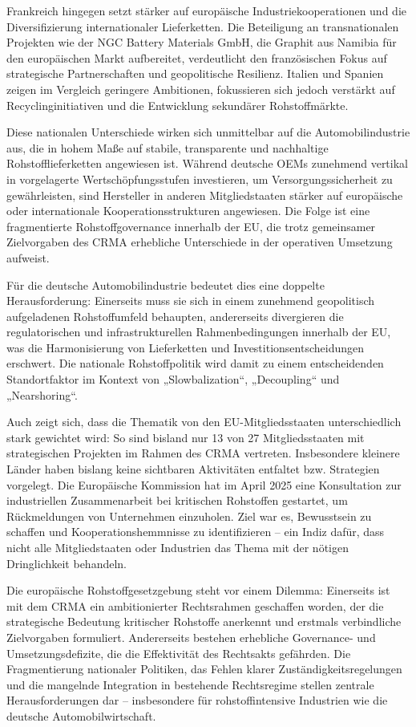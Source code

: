 \documentclass[12pt,a4paper,oneside]{book} %
\begin{document}
Frankreich hingegen setzt stärker auf europäische Industriekooperationen und die Diversifizierung internationaler Lieferketten. Die Beteiligung an transnationalen Projekten wie der NGC Battery Materials GmbH, die Graphit aus Namibia für den europäischen Markt aufbereitet, verdeutlicht den französischen Fokus auf strategische Partnerschaften und geopolitische Resilienz. Italien und Spanien zeigen im Vergleich geringere Ambitionen, fokussieren sich jedoch verstärkt auf Recyclinginitiativen und die Entwicklung sekundärer Rohstoffmärkte.

Diese nationalen Unterschiede wirken sich unmittelbar auf die Automobilindustrie aus, die in hohem Maße auf stabile, transparente und nachhaltige Rohstofflieferketten angewiesen ist. Während deutsche OEMs zunehmend vertikal in vorgelagerte Wertschöpfungsstufen investieren, um Versorgungssicherheit zu gewährleisten, sind Hersteller in anderen Mitgliedstaaten stärker auf europäische oder internationale Kooperationsstrukturen angewiesen. Die Folge ist eine fragmentierte Rohstoffgovernance innerhalb der EU, die trotz gemeinsamer Zielvorgaben des CRMA erhebliche Unterschiede in der operativen Umsetzung aufweist.

Für die deutsche Automobilindustrie bedeutet dies eine doppelte Herausforderung: Einerseits muss sie sich in einem zunehmend geopolitisch aufgeladenen Rohstoffumfeld behaupten, andererseits divergieren die regulatorischen und infrastrukturellen Rahmenbedingungen innerhalb der EU, was die Harmonisierung von Lieferketten und Investitionsentscheidungen erschwert. Die nationale Rohstoffpolitik wird damit zu einem entscheidenden Standortfaktor im Kontext von „Slowbalization“, „Decoupling“ und „Nearshoring“.

Auch zeigt sich, dass die Thematik von den EU-Mitgliedsstaaten unterschiedlich stark gewichtet wird: So sind bisland nur 13 von 27 Mitgliedsstaaten mit strategischen Projekten im Rahmen des CRMA vertreten. Insbesondere kleinere Länder haben bislang keine sichtbaren Aktivitäten entfaltet bzw. Strategien vorgelegt. Die Europäische Kommission hat im April 2025 eine Konsultation zur industriellen Zusammenarbeit bei kritischen Rohstoffen gestartet, um Rückmeldungen von Unternehmen einzuholen. Ziel war es, Bewusstsein zu schaffen und Kooperationshemmnisse zu identifizieren – ein Indiz dafür, dass nicht alle Mitgliedstaaten oder Industrien das Thema mit der nötigen Dringlichkeit behandeln.

Die europäische Rohstoffgesetzgebung steht vor einem Dilemma: Einerseits ist mit dem CRMA ein ambitionierter Rechtsrahmen geschaffen worden, der die strategische Bedeutung kritischer Rohstoffe anerkennt und erstmals verbindliche Zielvorgaben formuliert. Andererseits bestehen erhebliche Governance- und Umsetzungsdefizite, die die Effektivität des Rechtsakts gefährden. Die Fragmentierung nationaler Politiken, das Fehlen klarer Zuständigkeitsregelungen und die mangelnde Integration in bestehende Rechtsregime stellen zentrale Herausforderungen dar -- insbesondere für rohstoffintensive Industrien wie die deutsche Automobilwirtschaft.
\end{document}
